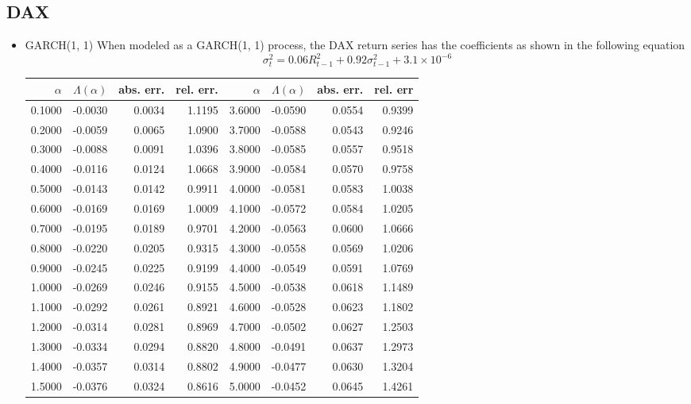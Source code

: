 \documentclass{article}
\theoremstyle{remark}
\begin{document}
\subsection{DAX}
\begin{itemize}
\item GARCH(1, 1)
  When modeled as a GARCH(1, 1) process, the DAX return series
  has the coefficients as shown in the following equation
  \[
  \sigma_t^2 = 0.06 R_{t-1}^2 + 0.92 \sigma_{t-1}^2 + 3.1 \times 10^{-6}
  \]
  \begin{table}[htb!]
    \centering
    \begin{tabular}{r|r|r|r||r|r|r|r}
      $\alpha$ & $\Lambda(\alpha)$ & abs. err. & rel. err. & $\alpha$
      & $\Lambda(\alpha)$ & abs. err. & rel. err \\
      \hline
      0.1000 & -0.0030 & 0.0034 & 1.1195 & 3.6000 & -0.0590 & 0.0554 & 0.9399 \\
      0.2000 & -0.0059 & 0.0065 & 1.0900 & 3.7000 & -0.0588 & 0.0543 & 0.9246 \\
      0.3000 & -0.0088 & 0.0091 & 1.0396 & 3.8000 & -0.0585 & 0.0557 & 0.9518 \\
      0.4000 & -0.0116 & 0.0124 & 1.0668 & 3.9000 & -0.0584 & 0.0570 & 0.9758 \\
      0.5000 & -0.0143 & 0.0142 & 0.9911 & 4.0000 & -0.0581 & 0.0583 & 1.0038 \\
      0.6000 & -0.0169 & 0.0169 & 1.0009 & 4.1000 & -0.0572 & 0.0584 & 1.0205 \\
      0.7000 & -0.0195 & 0.0189 & 0.9701 & 4.2000 & -0.0563 & 0.0600 & 1.0666 \\
      0.8000 & -0.0220 & 0.0205 & 0.9315 & 4.3000 & -0.0558 & 0.0569 & 1.0206 \\
      0.9000 & -0.0245 & 0.0225 & 0.9199 & 4.4000 & -0.0549 & 0.0591 & 1.0769 \\
      1.0000 & -0.0269 & 0.0246 & 0.9155 & 4.5000 & -0.0538 & 0.0618 & 1.1489 \\
      1.1000 & -0.0292 & 0.0261 & 0.8921 & 4.6000 & -0.0528 & 0.0623 & 1.1802 \\
      1.2000 & -0.0314 & 0.0281 & 0.8969 & 4.7000 & -0.0502 & 0.0627 & 1.2503 \\
      1.3000 & -0.0334 & 0.0294 & 0.8820 & 4.8000 & -0.0491 & 0.0637 & 1.2973 \\
      1.4000 & -0.0357 & 0.0314 & 0.8802 & 4.9000 & -0.0477 & 0.0630 & 1.3204 \\
      1.5000 & -0.0376 & 0.0324 & 0.8616 & 5.0000 & -0.0452 & 0.0645 & 1.4261 \\

\end{tabular}
\end{table}
\end{itemize}
\end{document}
